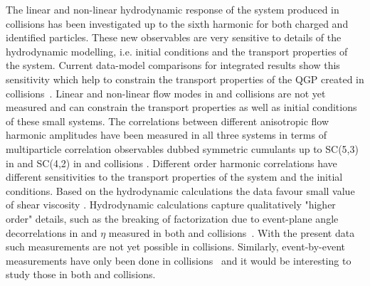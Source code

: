 \documentclass[../report.tex]{subfiles}
\begin{document}
The linear and non-linear hydrodynamic response of the system produced in \PbPb collisions has been investigated up to the sixth harmonic for both charged and identified particles. These new observables are very sensitive to details of the hydrodynamic modelling, i.e. initial conditions and the transport properties of the system. Current data-model comparisons for integrated \pT results show this sensitivity which help to constrain the transport properties of the QGP created in \PbPb collisions~\cite{Acharya:2017zfg}. Linear and non-linear flow modes in \pp and \pPb collisions are not yet measured and can constrain the transport properties as well as initial conditions of these small systems. The correlations between different anisotropic flow harmonic amplitudes have been measured in all three systems in terms of multiparticle correlation observables dubbed symmetric cumulants up to SC(5,3) in \PbPb and SC(4,2) in \pPb and \pp collisions \cite{Aad:2014fla,Aad:2015lwa,ALICE:2016kpq,Sirunyan:2017uyl,Acharya:2017gsw,Aaboud:2018syf}. Different order harmonic correlations have different sensitivities to the transport properties of the system and the initial conditions. Based on the hydrodynamic calculations the data favour small value of shear viscosity \cite{Zhu:2016puf}.
Hydrodynamic calculations capture qualitatively "higher order" details, such as the breaking of factorization due to event-plane angle decorrelations in \pT and $\eta$ measured in both \PbPb and \pPb collisions~\cite{Khachatryan:2015oea,Sirunyan:2017gyb,Acharya:2017ino}. With the present data such measurements are not yet possible in \pp collisions. Similarly, event-by-event \vn measurements have only been done in \PbPb collisions~\cite{Aad:2013xma,Sirunyan:2017fts} and it would be interesting to study those in both \pPb and \pp collisions. 
\end{document}
